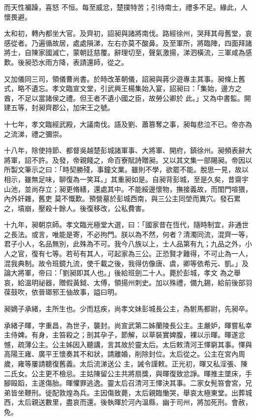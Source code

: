 \begin{pinyinscope}
 而天性褊躁，喜怒
 不恒。每至威忿，楚撲特苦；引待南士，禮多不足。緣此，人懷畏避。



 太和初，轉內都坐大官。及齊初，詔昶與諸將南伐。路經徐州，哭拜其母舊堂，哀感從者。乃遍循故居，處處隕涕，左右亦莫不酸鼻。及至軍所，將臨陣，四面拜諸將士，自陳家國滅亡，蒙朝廷慈覆。辭理切至，聲氣激揚，涕泗橫流，三軍咸為感歎。後昶恐水雨方降，表請還師，從之。



 又加儀同三司，領儀曹尚書。於時改革朝儀，詔昶與蔣少遊專主其事。昶條上舊式，略不遺忘。孝文臨宣文堂，引武興王楊集始入宴，詔昶曰：「集始，邊方之酋，不足以當諸侯之禮。但王者不遺小國之臣，故勞公卿於
 此。」又為中書監。開建五等，封昶齊郡公，加宋王之號。



 十七年，孝文臨經武殿，大議南伐。語及劉、蕭篡奪之事，昶每悲泣不已。帝亦為之流涕，禮之彌崇。



 十八年，除使持節、都督吳越楚彭城諸軍事、大將軍、開府，鎮徐州。昶頻表辭大將軍，詔不許。及發，帝親餞之，命百寮賦詩贈昶。又以其文集一部賜昶。帝因以所製文筆示之曰：「時契勝殘，事鐘文業。雖則不學，欲罷不能。脫思一見，故以相示，雖無足味，聊復為一笑耳。」其重昶如是。自昶背彭城，至是久矣，昔齋宇山池，並尚存立；昶更脩繕，還處其中。不能綏邊懷物，撫接義故，而閨門喧猥，內外奸雜，舊吏
 莫不慨歎。預營墓於彭城西南，與三公主同塋而異穴。發石累之，墳崩，壓殺十餘人。後復移改，公私費害。



 十九年，昶朝京師。孝文臨光極堂大選，曰：「國家昔在恆代，隨時制宜，非通世之長法。或言，唯能是寄，不必拘門。朕以為不然，何者？清濁同流，混齊一等，君子小人，名品無別，此殊為不可。我今八族以上，士人品第有九；九品之外，小人之官，復有七等。若茍有其人，可起家為三公。正恐賢才難得，不可止為一人，混我典制。故令班鏡九流，使千載之後，我得仿像唐、虞，卿等依希元、凱。」及論大將軍，帝曰：「劉昶即其人也。」後給班劍二十人。薨於彭城，孝文
 為之舉哀，給溫明祕器，贈假黃鉞、太傅，領揚州刺史。加以殊禮，備九錫，給前後部羽葆鼓吹，依晉瑯邪王伷故事，謚曰明。



 昶嫡子承緒，主所生也。少而尪疾，尚孝文妹彭城長公主，為駙馬都尉，先昶卒。



 承緒子暉，字重昌，為世子，襲封。尚宣武第二姊蘭陵長公主。主嚴妒，暉嘗私幸主侍婢。有身，主笞殺之；剖其孕子，節解，以草裝實婢腹，裸以示暉。暉遂忿憾，疏薄公主。公主姊因入聽講，言其故於靈太后。太后敕清河王懌窮其事。懌與高陽王雍、廣平王懷奏其不和狀，請離婚，削除封位。太后從之。公主在宮內周歲，雍等屢請聽復舊義。太后流涕送公
 主，誡令謹敕。正光初，暉又私淫張、陳二氏女。公主更不檢忌。主姑陳留公主共將扇獎，與暉復致忿諍。暉推主墜床，手腳毆蹈，主遂傷胎。暉懼罪逃逸。靈太后召清河王懌決其事。二家女髡笞會宮，兄弟皆坐鞭刑。徙配敦煌為兵。主因傷致薨，太后親臨慟哭，舉哀太極東堂。出葬城西，太后親送數里，盡哀而還。後執暉於河內溫縣，幽于司州，將加死刑。會赦，免。




\end{pinyinscope}
